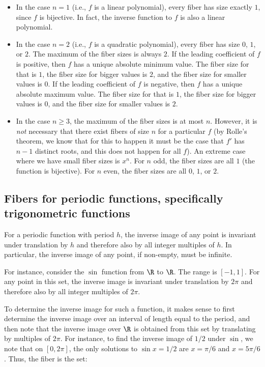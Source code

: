 \documentclass[10pt]{amsart}
\begin{document}
\begin{itemize}
\item In the case $n = 1$ (i.e., $f$ is a linear polynomial), every
  fiber has size exactly $1$, since $f$ is bijective. In fact, the
  inverse function to $f$ is also a linear polynomial.
\item In the case $n = 2$ (i.e., $f$ is a quadratic polynomial), every
  fiber has size $0$, $1$, or $2$. The maximum of the fiber sizes is
  always $2$. If the leading coefficient of $f$ is positive, then $f$
  has a unique absolute minimum value. The fiber size for that is $1$,
  the fiber size for bigger values is $2$, and the fiber size for
  smaller values is $0$. If the leading coefficient of $f$ is
  negative, then $f$ has a unique absolute maximum value. The fiber
  size for that is $1$, the fiber size for bigger values is $0$, and
  the fiber size for smaller values is $2$.
\item In the case $n \ge 3$, the maximum of the fiber sizes is at most
  $n$. However, it is {\em not} necessary that there exist fibers of
  size $n$ for a particular $f$ (by Rolle's theorem, we know that for
  this to happen it must be the case that $f'$ has $n -1$ distinct
  roots, and this does not happen for all $f$). An extreme case where
  we have small fiber sizes is $x^n$. For $n$ odd, the fiber sizes are
  all $1$ (the function is bijective). For $n$ even, the fiber sizes
  are all $0$, $1$, or $2$.
\end{itemize}

\subsection{Fibers for periodic functions, specifically trigonometric functions}

For a periodic function with period $h$, the inverse image of any
point is invariant under translation by $h$ and therefore also by all
integer multiples of $h$. In particular, the inverse image of any
point, if non-empty, must be infinite.

For instance, consider the $\sin$ function from $\R$ to $\R$. The
range is $[-1,1]$. For any point in this set, the inverse image is
invariant under translation by $2\pi$ and therefore also by all
integer multiples of $2\pi$.

To determine the inverse image for such a function, it makes sense to
first determine the inverse image over an interval of length equal to
the period, and then note that the inverse image over $\R$ is obtained
from this set by translating by multiples of $2\pi$. For instance, to
find the inverse image of $1/2$ under $\sin$, we note that on
$[0,2\pi]$, the only solutions to $\sin x = 1/2$ are $x = \pi/6$ and
$x = 5\pi/6$. Thus, the fiber is the set:
\end{document}
